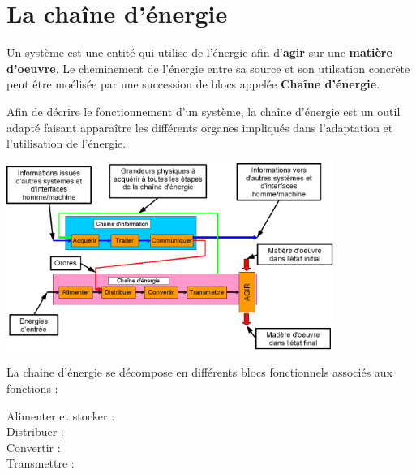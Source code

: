 \documentclass[10pt,fleqn]{article} %
\begin{document}
\section{La chaîne d'énergie}
Un système est une entité qui utilise de l'énergie afin d'\textbf{agir} sur une \textbf{matière d'oeuvre}. Le cheminement de l'énergie entre sa source et son utilsation concrète peut être moélisée par une succession de blocs appelée \textbf{Chaîne d'énergie}.

\begin{obj}
  Afin de décrire le fonctionnement d'un système, la chaîne d'énergie est un outil adapté faisant apparaître les différents organes impliqués dans l'adaptation et l'utilisation de l'énergie.
\end{obj}


\begin{center}
\vspace{0.3cm}
    \includegraphics[width=0.8\textwidth]{images/Chainefonctionnelcomplete.png}
    \vspace{0.3cm}
\end{center}

\begin{defi}
La chaine d'énergie se décompose en différents blocs fonctionnels associés aux fonctions :

    \begin{description}
  \item[Alimenter et stocker : ] 
  \item[Distribuer : ] 
  \item[Convertir : ] 
  \item[Transmettre : ] 
\end{description}
\end{defi}
\end{document}
